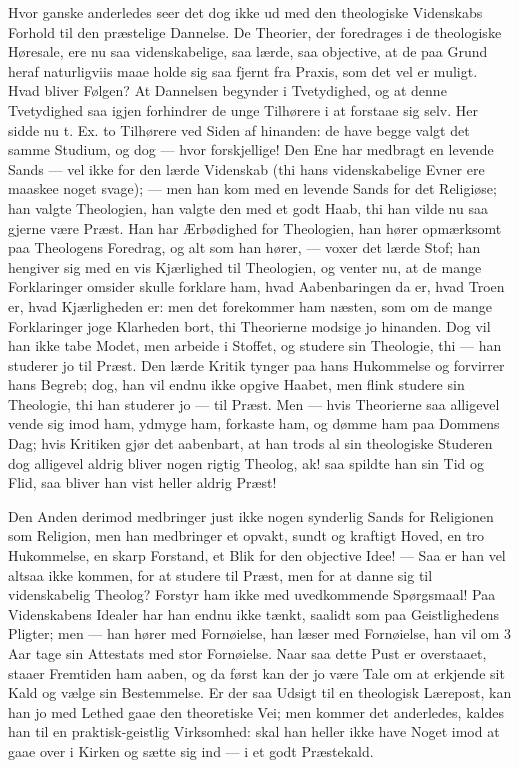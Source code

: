 \documentclass[12pt,a4paper]{book}
\newcommand{\opage}[1]{\marginnote{\footnotesize\textit{[#1]}}}
\begin{document}
Hvor ganske anderledes seer det dog ikke ud med den theologiske Videnskabs
Forhold til den præstelige Dannelse. De Theorier, der foredrages i de
theologiske Høresale, ere nu saa videnskabelige, saa lærde, saa objective,
at de paa Grund heraf naturligviis maae holde sig saa fjernt fra Praxis,
som det vel er muligt. Hvad bliver Følgen? At Dannelsen begynder i
Tvetydighed, og at denne Tvetydighed saa igjen forhindrer de unge Tilhørere
i at forstaae sig selv. Her sidde nu t. Ex. to Tilhørere ved Siden af
hinanden: de have begge valgt det samme Studium, og dog --- hvor
forskjellige! Den Ene har medbragt en levende Sands --- vel ikke for den
lærde Videnskab (thi hans videnskabelige Evner ere maaskee noget svage);
--- men han kom med en levende Sands for det Religiøse; han valgte
Theologien, han valgte den med et godt Haab, thi han vilde nu saa gjerne
være Præst. Han har Ærbødighed for Theologien, han hører opmærksomt paa
Theologens Foredrag, og alt som han hører, --- voxer det lærde Stof; han
hengiver sig med en vis Kjærlighed til Theologien, og venter nu, at de
mange Forklaringer omsider skulle forklare ham, hvad Aabenbaringen da er,
hvad Troen er, hvad Kjærligheden er: men det forekommer ham næsten,
\opage{136} som om de mange Forklaringer joge Klarheden bort, thi Theorierne modsige jo
hinanden. Dog vil han ikke tabe Modet, men arbeide i Stoffet, og studere
sin Theologie, thi --- han studerer jo til Præst. Den lærde Kritik tynger
paa hans Hukommelse og forvirrer hans Begreb; dog, han vil endnu ikke
opgive Haabet, men flink studere sin Theologie, thi han studerer jo --- til
Præst. Men --- hvis Theorierne saa alligevel vende sig imod ham, ydmyge
ham, forkaste ham, og dømme ham paa Dommens Dag; hvis Kritiken gjør det
aabenbart, at han trods al sin theologiske Studeren dog alligevel aldrig
bliver nogen rigtig Theolog, ak! saa spildte han sin Tid og Flid, saa
bliver han vist heller aldrig Præst!

Den Anden derimod medbringer just ikke nogen synderlig Sands for Religionen
som Religion, men han medbringer et opvakt, sundt og kraftigt Hoved, en tro
Hukommelse, en skarp Forstand, et Blik for den objective Idee! --- Saa er
han vel altsaa ikke kommen, for at studere til Præst, men for at danne sig
til videnskabelig Theolog? Forstyr ham ikke med uvedkommende Spørgsmaal!
Paa Videnskabens Idealer har han endnu ikke tænkt, saalidt som paa
Geistlighedens Pligter; men --- han hører med Fornøielse, han læser med
Fornøielse, han vil om 3 Aar tage sin Attestats med stor Fornøielse. Naar
saa dette Pust er overstaaet, staaer Fremtiden ham aaben, og da først kan
der jo være Tale om at erkjende sit Kald og vælge sin Bestemmelse. Er der
saa Udsigt til en theologisk Lærepost, kan han jo med Lethed gaae den
theoretiske Vei; men kommer det anderledes, kaldes han til en
praktisk-geistlig Virksomhed: skal han heller ikke have Noget imod at gaae
over i Kirken og sætte sig ind --- i et godt Præstekald.
\end{document}
